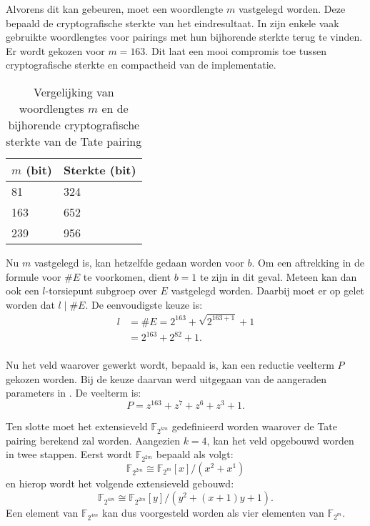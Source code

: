 Alvorens dit kan gebeuren, moet een woordlengte $m$ vastgelegd worden. Deze bepaald de cryptografische sterkte van het eindresultaat. In  zijn enkele vaak gebruikte woordlengtes voor pairings met hun bijhorende sterkte terug te vinden. Er wordt gekozen voor $m = 163$. Dit laat een mooi compromis toe tussen cryptografische sterkte en compactheid van de implementatie.

\begin{table}[h]
	\caption{Vergelijking van woordlengtes $m$ en de bijhorende cryptografische sterkte van de Tate pairing}
	\label{tabel-implementatie-parameters-keylength}

	\centering
	\begin{tabular}{|l|l|}
		\hline
		$m$ (bit)	& Sterkte (bit)\\
		\hline
		81		& 324\\
		163	& 652\\
		239	& 956\\
		\hline		
	\end{tabular}
\end{table}

Nu $m$ vastgelegd is, kan hetzelfde gedaan worden voor $b$. Om een aftrekking in de formule voor $\#E$ te voorkomen, dient $b = 1$ te zijn in dit geval. Meteen kan dan ook een $l$-torsiepunt subgroep over $E$ vastgelegd worden. Daarbij moet er op gelet worden dat $l \mid \#E$. De eenvoudigste keuze is:
\[\begin{aligned}
l	&= \#E = 2^{163} + \sqrt{2^{163 + 1}} + 1\\
	&= 2^{163} + 2^{82} + 1.\\
\end{aligned}\]

Nu het veld waarover gewerkt wordt, bepaald is, kan een reductie veelterm $P$ gekozen worden. Bij de keuze daarvan werd uitgegaan van de aangeraden parameters in \cite{sec2}. De veelterm is:
\[P = z^{163} + z^7 + z^6 + z^3 + 1.\]

Ten slotte moet het extensieveld $\mathbb{F}_{2^{k m}}$ gedefinieerd worden waarover de Tate pairing berekend zal worden. Aangezien $k = 4$, kan het veld opgebouwd worden in twee stappen. Eerst wordt $\mathbb{F}_{2^{2m}}$ bepaald als volgt:
\[\mathbb{F}_{2^{2m}} \cong \mathbb{F}_{2^m}[x]/(x^2 + x ^ 1)\]
en hierop wordt het volgende extensieveld gebouwd:
\[\mathbb{F}_{2^{4m}} \cong \mathbb{F}_{2^{2m}}[y]/(y^2 + (x + 1)y + 1).\]
Een element van $\mathbb{F}_{2^{4m}}$ kan dus voorgesteld worden als vier elementen van $\mathbb{F}_{2^m}$.


